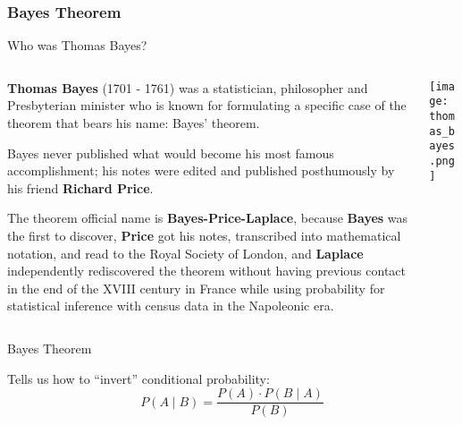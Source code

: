 \subsubsection{Bayes Theorem}
\begin{frame}{Who was Thomas Bayes?}
	\begin{columns}
		\begin{column}{0.8\textwidth}
			\begin{vfilleditems}
				\item \small \textbf{Thomas Bayes} (1701 - 1761) was a statistician, philosopher
				and Presbyterian minister who is known for formulating a specific
				case of the theorem that bears his name: Bayes' theorem.
				\item \small Bayes never published what would become his most famous
				accomplishment; his notes were edited and published posthumously by
				his friend \textbf{Richard Price}.
				\item \small The theorem official name is \textbf{Bayes-Price-Laplace},
				because \textbf{Bayes} was the first to discover,
				\textbf{Price} got his notes, transcribed into mathematical notation,
				and read to the Royal Society of London,
				and \textbf{Laplace} independently rediscovered the theorem without
				having previous contact in the end of the XVIII century in France
				while using probability for statistical inference with census
				data in the Napoleonic era.
			\end{vfilleditems}
		\end{column}
		\begin{column}{0.2\textwidth}
			\centering
			\texttt{[image: thomas\_bayes.png]}
		\end{column}
	\end{columns}
\end{frame}

\begin{frame}{Bayes Theorem}
	\begin{theorem}[Bayes]
		Tells us how to ``invert'' conditional probability: \newline \newline
		$$P(A \mid B) = \frac{P(A) \cdot P(B \mid A)}{P(B)}$$
	\end{theorem}
\end{frame}

